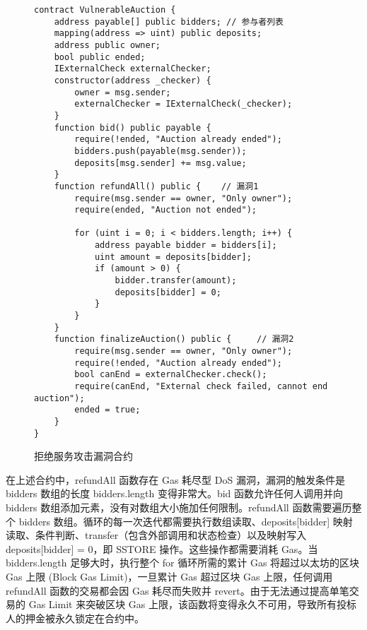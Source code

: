 \documentclass[print, master, vlined, timesmath]{DissertUESTC}
\begin{document}
\begin{figure}
    \centering
    \begin{minipage}{0.9\textwidth}
    \begin{verbatim}
contract VulnerableAuction {
    address payable[] public bidders; // 参与者列表
    mapping(address => uint) public deposits;
    address public owner;
    bool public ended;
    IExternalCheck externalChecker;
    constructor(address _checker) {
        owner = msg.sender;
        externalChecker = IExternalCheck(_checker);
    }
    function bid() public payable {
        require(!ended, "Auction already ended");
        bidders.push(payable(msg.sender));
        deposits[msg.sender] += msg.value;
    }
    function refundAll() public {    // 漏洞1
        require(msg.sender == owner, "Only owner");
        require(ended, "Auction not ended");

        for (uint i = 0; i < bidders.length; i++) {
            address payable bidder = bidders[i];
            uint amount = deposits[bidder];
            if (amount > 0) {
                bidder.transfer(amount);
                deposits[bidder] = 0;
            }
        }
    }
    function finalizeAuction() public {     // 漏洞2
        require(msg.sender == owner, "Only owner");
        require(!ended, "Auction already ended");
        bool canEnd = externalChecker.check();
        require(canEnd, "External check failed, cannot end auction");
        ended = true;
    }
}
    \end{verbatim}
    \end{minipage}
    \caption{拒绝服务攻击漏洞合约}
    \label{fig:拒绝服务攻击漏洞合约}
\end{figure}

在上述合约中，refundAll 函数存在 Gas 耗尽型 DoS 漏洞，漏洞的触发条件是 bidders 数组的长度 bidders.length 变得非常大。bid 函数允许任何人调用并向 bidders 数组添加元素，没有对数组大小施加任何限制。refundAll 函数需要遍历整个 bidders 数组。循环的每一次迭代都需要执行数组读取、deposits[bidder] 映射读取、条件判断、transfer（包含外部调用和状态检查）以及映射写入 deposits[bidder] = 0，即 SSTORE 操作。这些操作都需要消耗 Gas。当 bidders.length 足够大时，执行整个 for 循环所需的累计 Gas 将超过以太坊的区块 Gas 上限 (Block Gas Limit)，一旦累计 Gas 超过区块 Gas 上限，任何调用 refundAll 函数的交易都会因 Gas 耗尽而失败并 revert。由于无法通过提高单笔交易的 Gas Limit 来突破区块 Gas 上限，该函数将变得永久不可用，导致所有投标人的押金被永久锁定在合约中。
\end{document}
